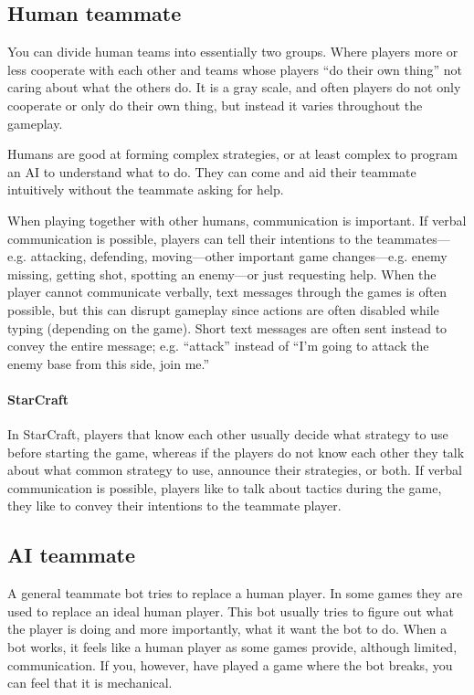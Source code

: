 \subsection{Human teammate}
You can divide human teams into essentially two groups. Where players more or less cooperate with each other and teams whose players “do their own thing” not caring about what the others do. It is a gray scale, and often players do not only cooperate or only do their own thing, but instead it varies throughout the gameplay.

Humans are good at forming complex strategies, or at least complex to program an AI to understand what to do. They can come and aid their teammate intuitively without the teammate asking for help.

When playing together with other humans, communication is important. If verbal communication is possible, players can tell their intentions to the teammates—e.g. attacking, defending, moving—other important game changes—e.g. enemy missing, getting shot, spotting an enemy—or just requesting help. When the player cannot communicate verbally, text messages through the games is often possible, but this can disrupt gameplay since actions are often disabled while typing (depending on the game). Short text messages are often sent instead to convey the entire message; e.g. “attack” instead of “I’m going to attack the enemy base from this side, join me.” 

\paragraph{StarCraft}
In StarCraft, players that know each other usually decide what strategy to use before starting the game, whereas if the players do not know each other they talk about what common strategy to use, announce their strategies, or both. If verbal communication is possible, players like to talk about tactics during the game, they like to convey their intentions to the teammate player.

\subsection{AI teammate}
A general teammate bot tries to replace a human player. In some games they are used to replace an ideal human player. This bot usually tries to figure out what the player is doing and more importantly, what it want the bot to do. When a bot works, it feels like a human player as some games provide, although limited, communication. If you, however, have played a game where the bot breaks, you can feel that it is mechanical.

